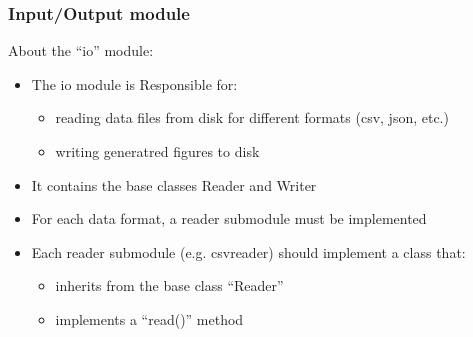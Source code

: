 \begin{frame}
  \frametitle{Input/Output module}
  About the ``io'' module:
  \begin{itemize}
    \item The io module is Responsible for:
      \begin{itemize}
        \item reading data files from disk for different 
          formats (csv, json, etc.) %
        \item writing generatred figures to disk
      \end{itemize}
    \item It contains the base classes Reader and Writer
    \item For each data format, a reader submodule must be implemented
    \item Each reader submodule (e.g. csvreader) should implement a class that:
      \begin{itemize}
        \item inherits from the base class ``Reader''
        \item implements a ``read()'' method
      \end{itemize}
  \end{itemize}
\end{frame}
